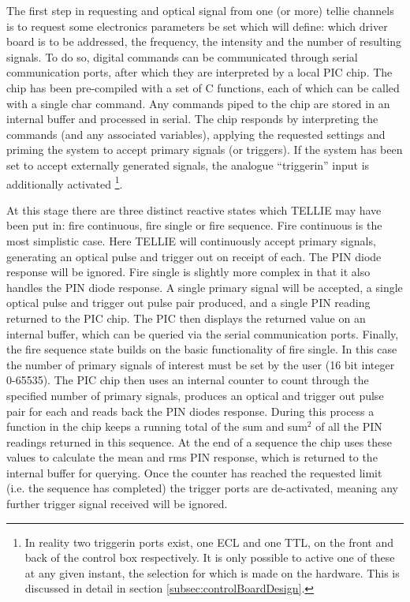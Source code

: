 \documentclass[12pt]{report}
\begin{document}
The first step in requesting and optical signal from one (or more) tellie channels is to request some electronics parameters be set which will define: which driver board is to be addressed, the frequency, the intensity and the number of resulting signals. To do so, digital commands can be communicated through serial communication ports, after which they are interpreted by a local PIC chip. The chip has been pre-compiled with a set of C functions, each of which can be called with a single char command. Any commands piped to the chip are stored in an internal buffer and processed in serial. The chip responds by interpreting the commands (and any associated variables), applying the requested settings and priming the system to accept primary signals (or triggers). If the system has been set to accept externally generated signals, the analogue ``trigger\textunderscore in'' input is additionally activated \footnote{In reality two trigger\textunderscore in ports exist, one ECL and one TTL, on the front and back of the control box respectively. It is only possible to active one of these at any given instant, the selection for which is made on the hardware. This is discussed in detail in section \ref{subsec:controlBoardDesign}.}. 

At this stage there are three distinct reactive states which TELLIE may have been put in: fire continuous, fire single or fire sequence. Fire continuous is the most simplistic case. Here TELLIE will continuously accept primary signals, generating an optical pulse and trigger out on receipt of each. The PIN diode response will be ignored. Fire single is slightly more complex in that it also handles the PIN diode response. A single primary signal will be accepted, a single optical pulse and trigger out pulse pair produced, and a single PIN reading returned to the PIC chip. The PIC then displays the returned value on an internal buffer, which can be queried via the serial communication ports. Finally, the fire sequence state builds on the basic functionality of fire single. In this case the number of primary signals of interest must be set by the user (16 bit integer 0-65535). The PIC chip then uses an internal counter to count through the specified number of primary signals, produces an optical and trigger out pulse pair for each and reads back the PIN diodes response. During this process a function in the chip keeps a running total of the sum and sum$^2$ of all the PIN readings returned in this sequence. At the end of a sequence the chip uses these values to calculate the mean and rms PIN response, which is returned to the internal buffer for querying.  Once the counter has reached the requested limit (i.e. the sequence has completed) the trigger ports are de-activated, meaning any further trigger signal received will be ignored.
\end{document}
